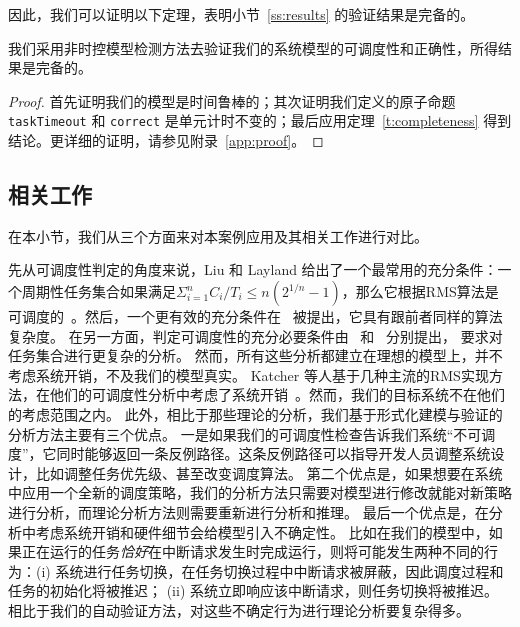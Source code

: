 因此，我们可以证明以下定理，表明小节~\ref{ss:results} 的验证结果是完备的。
\begin{theorem}
\label{t:main}
我们采用非时控模型检测方法去验证我们的系统模型的可调度性和正确性，所得结果是完备的。
\end{theorem}
\begin{proof}
首先证明我们的模型是时间鲁棒的；其次证明我们定义的原子命题 \verb|taskTimeout| 和 \verb|correct| 是单元计时不变的；最后应用定理~\ref{t:completeness} 得到结论。更详细的证明，请参见附录~\ref{app:proof}。
\end{proof}


\subsection{相关工作}
\label{s:relate}
在本小节，我们从三个方面来对本案例应用及其相关工作进行对比。

先从可调度性判定的角度来说，Liu 和 Layland 给出了一个最常用的充分条件：一个周期性任务集合如果满足$\Sigma^n_{i=1} C_i/T_i \le n(2^{1/n}-1)$，那么它根据RMS算法是可调度的~\cite{DBLP:journals/jacm/LiuL73}。然后，一个更有效的充分条件在~ 被提出，它具有跟前者同样的算法复杂度。
在另一方面，判定可调度性的充分必要条件由~ 和~ 分别提出，
要求对任务集合进行更复杂的分析。
然而，所有这些分析都建立在理想的模型上，并不考虑系统开销，不及我们的模型真实。
Katcher 等人基于几种主流的RMS实现方法，在他们的可调度性分析中考虑了系统开销~\cite{DBLP:journals/tse/KatcherAS93}。然而，我们的目标系统不在他们的考虑范围之内。
此外，相比于那些理论的分析，我们基于形式化建模与验证的分析方法主要有三个优点。 
一是如果我们的可调度性检查告诉我们系统“不可调度”，它同时能够返回一条反例路径。这条反例路径可以指导开发人员调整系统设计，比如调整任务优先级、甚至改变调度算法。
第二个优点是，如果想要在系统中应用一个全新的调度策略，我们的分析方法只需要对模型进行修改就能对新策略进行分析，而理论分析方法则需要重新进行分析和推理。
最后一个优点是，在分析中考虑系统开销和硬件细节会给模型引入不确定性。
比如在我们的模型中，如果正在运行的任务\emph{恰好}在中断请求发生时完成运行，则将可能发生两种不同的行为：(i) 系统进行任务切换，在任务切换过程中中断请求被屏蔽，因此调度过程和任务的初始化将被推迟；
(ii) 系统立即响应该中断请求，则任务切换将被推迟。
相比于我们的自动验证方法，对这些不确定行为进行理论分析要复杂得多。


